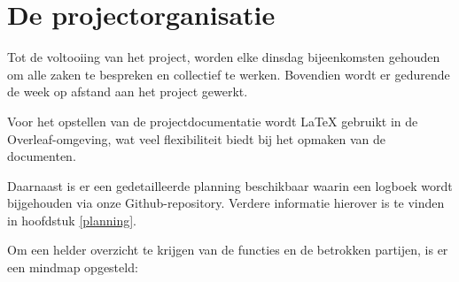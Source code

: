 \section{De projectorganisatie}
Tot de voltooiing van het project, worden elke dinsdag bijeenkomsten gehouden om alle zaken te bespreken en collectief te werken. Bovendien wordt er gedurende de week op afstand aan het project gewerkt.

Voor het opstellen van de projectdocumentatie wordt LaTeX gebruikt in de Overleaf-omgeving, wat veel flexibiliteit biedt bij het opmaken van de documenten.

Daarnaast is er een gedetailleerde planning beschikbaar waarin een logboek wordt bijgehouden via onze Github-repository. Verdere informatie hierover is te vinden in hoofdstuk \ref{planning}.

Om een helder overzicht te krijgen van de functies en de betrokken partijen, is er een mindmap opgesteld:%



\vspace{1cm} 
\begin{minipage}[t][][b]{\linewidth}
  
\end{minipage}